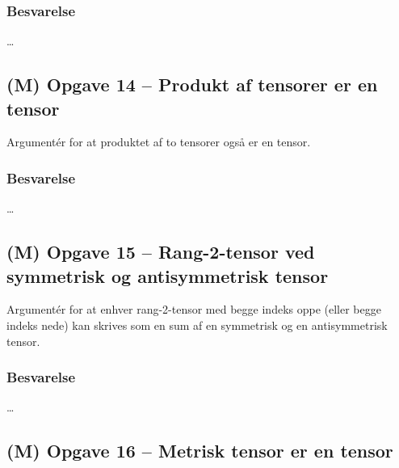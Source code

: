 \documentclass[../main.tex]{subfiles}
\begin{document}

\subsubsection{Besvarelse}

\ldots




\subsection{(M) Opgave 14 -- Produkt af tensorer er en tensor}
\setcounter{subsection}{14}
\setcounter{equation}{0}

Argumentér for at produktet af to tensorer også er en tensor.


\subsubsection{Besvarelse}

\ldots




\subsection{(M) Opgave 15 -- Rang-2-tensor ved symmetrisk og antisymmetrisk tensor}
\setcounter{subsection}{15}
\setcounter{equation}{0}

Argumentér for at enhver rang-2-tensor med begge indeks oppe (eller begge indeks nede) kan skrives som en sum af en symmetrisk og en antisymmetrisk tensor.


\subsubsection{Besvarelse}

\ldots




\subsection{(M) Opgave 16 -- Metrisk tensor er en tensor}
\setcounter{subsection}{16}
\setcounter{equation}{0}
\end{document}
